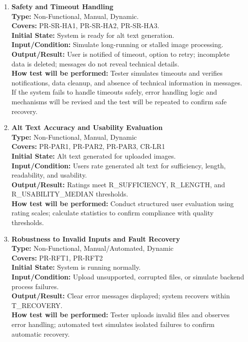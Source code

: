 \documentclass[12pt, titlepage]{article}
\begin{document}
\begin{enumerate}[label=NFR-ST \arabic*., wide=0pt, leftmargin=*]
  \item \textbf{Safety and Timeout Handling} \\[2mm]
    \textbf{Type:} Non-Functional, Manual, Dynamic. \\
    \textbf{Covers:} PR-SR-HA1, PR-SR-HA2, PR-SR-HA3. \\
    \textbf{Initial State:} System is ready for alt text generation. \\
    \textbf{Input/Condition:} Simulate long-running or stalled image
    processing. \\
    \textbf{Output/Result:} User is notified of timeout, option to
    retry; incomplete data is deleted; messages do not reveal
    technical details. \\ [2mm]
    \textbf{How test will be performed:} Tester simulates timeouts
    and verifies notifications, data cleanup, and absence of
    technical information in messages. If the system fails to handle timeouts safely, 
    error handling logic and mechanisms will be revised and the test will 
    be repeated to confirm safe recovery.

  \item \textbf{Alt Text Accuracy and Usability Evaluation} \\[2mm]
    \textbf{Type:} Non-Functional, Manual, Dynamic \\
    \textbf{Covers:} PR-PAR1, PR-PAR2, PR-PAR3, CR-LR1 \\
    \textbf{Initial State:} Alt text generated for uploaded images. \\
    \textbf{Input/Condition:} Users rate generated alt text for
    sufficiency, length, readability, and usability. \\
    \textbf{Output/Result:} Ratings meet R\_SUFFICIENCY, R\_LENGTH, and
    R\_USABILITY\_MEDIAN thresholds. \\[2mm]
    \textbf{How test will be performed:} Conduct structured user
    evaluation using rating scales; calculate statistics to confirm
    compliance with quality thresholds.

  \item \textbf{Robustness to Invalid Inputs and Fault Recovery} \\[2mm]
    \textbf{Type:} Non-Functional, Manual/Automated, Dynamic \\
    \textbf{Covers:} PR-RFT1, PR-RFT2 \\
    \textbf{Initial State:} System is running normally. \\
    \textbf{Input/Condition:} Upload unsupported, corrupted files, or
    simulate backend process failures. \\
    \textbf{Output/Result:} Clear error messages displayed; system
    recovers within T\_RECOVERY. \\[2mm]
    \textbf{How test will be performed:} Tester uploads invalid files
    and observes error handling; automated test simulates isolated
    failures to confirm automatic recovery.


\end{enumerate}
\end{document}
